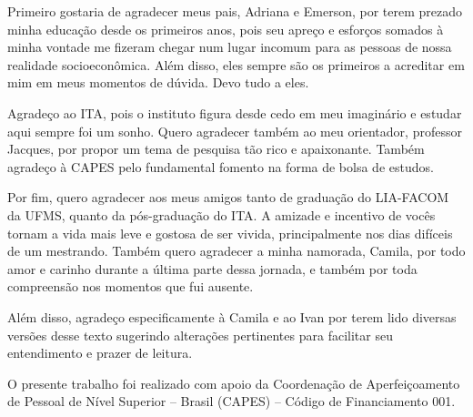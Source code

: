 Primeiro gostaria de agradecer meus pais, Adriana e Emerson, por terem prezado minha educação 
desde os primeiros anos, pois seu apreço e esforços somados à minha vontade me 
fizeram chegar num lugar incomum para as pessoas de nossa realidade 
socioeconômica. Além disso, eles sempre são os 
primeiros a acreditar em mim em meus momentos de dúvida. Devo 
tudo a eles.

Agradeço ao ITA, pois o instituto figura desde cedo em meu imaginário e estudar aqui sempre foi um sonho. Quero agradecer também ao 
meu orientador, professor Jacques, por propor um tema de pesquisa tão rico e apaixonante. Também agradeço à CAPES pelo fundamental fomento na 
forma de bolsa de estudos.

Por fim, quero agradecer aos meus amigos tanto de graduação do LIA-FACOM da UFMS, quanto da pós-graduação do ITA. A amizade e incentivo de vocês tornam a 
vida mais leve e gostosa de ser vivida, principalmente nos dias difíceis 
de um mestrando. Também quero agradecer a minha namorada, Camila, por 
todo amor e carinho durante a última parte dessa jornada, e também por toda compreensão nos momentos que fui ausente.

Além disso, agradeço especificamente à Camila e ao Ivan por terem lido 
diversas versões desse texto sugerindo alterações pertinentes para 
facilitar seu entendimento e prazer de leitura.

O presente trabalho foi realizado com apoio da Coordenação de Aperfeiçoamento de Pessoal de Nível Superior – Brasil (CAPES) – Código de Financiamento 001.